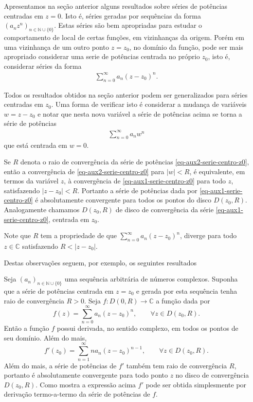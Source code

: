 Apresentamos na seção anterior alguns resultados sobre séries de potências 
centradas em $z=0$. Isto é,
séries geradas por sequências da forma 
$(a_nz^n)_{n\in\mathbb{N}\cup\{0\}}$. 
Estas séries são bem apropriadas para estudar o comportamento de 
local de certas funções, em vizinhanças da origem.
Porém em uma vizinhança de um outro ponto $z=z_0$, no domínio da função, 
pode ser mais apropriado considerar uma serie de potências centrada
no próprio $z_0$, isto é, considerar séries da forma 
\begin{align}\label{eq-aux1-serie-centro-z0}
\sum_{n=0}^{\infty} a_n(z-z_0)^n.
\end{align}

Todos os resultados obtidos na seção anterior podem ser generalizados
para séries centradas em $z_0$. Uma forma de verificar isto é 
considerar a mudança de variáveis $w=z-z_0$ e
notar que nesta nova variável a série de potências acima se torna 
a série de potências 
\begin{align}\label{eq-aux2-serie-centro-z0}
\sum_{n=0}^{\infty} a_nw^n
\end{align}
que está centrada em $w=0$.

Se $R$ denota o raio de convergência da série
de potências \eqref{eq-aux2-serie-centro-z0}, então a
convergência de \eqref{eq-aux2-serie-centro-z0} para $|w|<R$, 
é equivalente, em termos da variável $z$, à convergência
de \eqref{eq-aux1-serie-centro-z0} para todo $z$, 
satisfazendo $|z-z_0|<R$. Portanto a série de potências
dada por \eqref{eq-aux1-serie-centro-z0} é absolutamente 
convergente para todos os pontos do disco $D(z_0,R)$.
Analogamente chamamos $D(z_0,R)$ de disco de convergência 
da série \eqref{eq-aux1-serie-centro-z0}, centrada em $z_0$.

\medskip 

Note que $R$ tem a propriedade de que 
$\sum_{n=0}^{\infty} a_n(z-z_0)^n$, 
diverge para todo $z\in\mathbb{C}$ satisfazendo $R<|z-z_0|$.
 
\medskip 

Destas observações seguem, por exemplo, os seguintes resultados

\begin{teorema}\label{teo-diff-serie-pot-centro-z0}
Seja $(a_n)_{n\in\mathbb{N}\cup\{0\}}$ uma sequência arbitrária de números complexos.
Suponha que a série de potências centrada em $z=z_0$ e gerada por esta sequência tenha raio de convergência $R>0$. 
Seja $f:D(0,R)\to\mathbb{C}$ a função dada por
\[
f(z) = \sum_{n=0}^{\infty}a_n(z-z_0)^n, \qquad \forall z\in D(z_0,R).
\]
Então a função $f$ possui derivada, no sentido complexo, em todos os 
pontos de seu domínio. Além do mais, 
\[
f'(z_0) = \sum_{n=1}^{\infty}na_n(z-z_0)^{n-1}, \qquad\forall z\in D(z_0,R).
\]
Além do mais, a série de potências de $f'$ também tem raio de convergência $R$,
portanto é absolutamente convergente para todo ponto $z$ no 
disco de convergência $D(z_0,R)$. Como mostra a expressão acima 
$f'$ pode ser obtida simplesmente 
por derivação termo-a-termo da série de potências de $f$.
\end{teorema}



